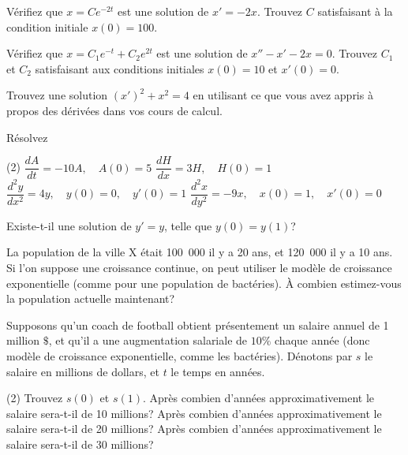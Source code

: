 \begin{exercise}
	Vérifiez que $x = C e^{-2t}$ est une solution de $x' = -2x$.
	Trouvez $C$ satisfaisant à la condition initiale $x(0) = 100$.
\end{exercise}

\begin{exercise}
	Vérifiez que $x = C_1 e^{-t} + C_2 e^{2t}$ est une solution de $x'' - x' -2 x =	0$.
	Trouvez $C_1$ et $C_2$ satisfaisant aux conditions initiales $x(0) = 10$
	et $x'(0) = 0$.
\end{exercise}

\begin{exercise}
	Trouvez une solution
	${(x')}^2 + x^2 = 4$
	en utilisant ce que vous avez appris à propos des dérivées dans vos cours de calcul.
\end{exercise}

\begin{exercise}
	Résolvez
	\begin{tasks}(2)
		\task $\dfrac{dA}{dt} = -10 A, \quad A(0)=5$
		\task $\dfrac{dH}{dx} = 3 H, \quad H(0)=1$
		\task $\dfrac{d^2y}{dx^2} = 4 y, \quad y(0)=0, \quad y'(0)=1$
		\task $\dfrac{d^2x}{dy^2} = -9 x, \quad x(0)=1, \quad x'(0)=0$
	\end{tasks}
\end{exercise}

\begin{exercise}
	Existe-t-il une solution de $y' = y$, telle que $y(0) = y(1)$?
\end{exercise}

\begin{exercise}
	La population de la ville X était 100~000 il y a 20 ans, et 120~000 il y a 10 ans.  
	Si l'on suppose une croissance continue, on peut utiliser le modèle de croissance exponentielle
	(comme pour une population de bactéries). À combien estimez-vous la population actuelle maintenant?
\end{exercise}

\begin{exercise}
	Supposons qu'un coach de football obtient présentement un salaire annuel de 1 million $\$$,
	et qu'il a une augmentation salariale de $10\%$ chaque année (donc modèle de croissance exponentielle, comme les bactéries).
	Dénotons par $s$ le salaire en millions de dollars, et $t$ le temps en années.
	\begin{tasks}(2)
	\task Trouvez $s(0)$ et $s(1)$.
	\task Après combien d'années approximativement le salaire sera-t-il de 10 millions?
	\task Après combien d'années approximativement le salaire sera-t-il de 20 millions?
	\task Après combien d'années approximativement le salaire sera-t-il de 30 millions?
	\end{tasks}
\end{exercise}


